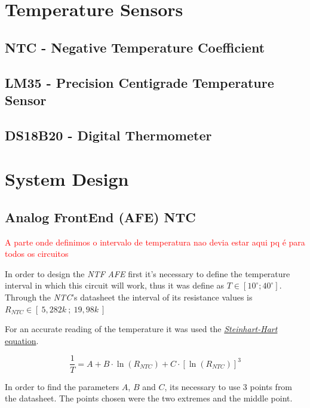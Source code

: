 \documentclass[12pt]{article}
\begin{document}
\section{Temperature Sensors}
\subsection{NTC - Negative Temperature Coefficient}

\subsection{LM35 - Precision Centigrade Temperature Sensor}

\subsection{DS18B20 - Digital Thermometer}

\section{System Design}
\subsection{Analog FrontEnd (AFE) NTC}
\label{ AFENTC }

    \textcolor{red}{A parte onde definimos o intervalo de temperatura nao devia estar aqui pq é para todos os circuitos}


    In order to design the \textit{NTF} \textit{AFE} first it's necessary to define the temperature interval
    in which this circuit will work, thus it was define as $T \in [ 10^{\circ}; 40^{\circ} ]$. 
    Through the \textit{NTC}'s datasheet the interval of its resistance values is $R_{NTC} \in [~5,282k~;~19,98k~]$

    For an accurate reading of the temperature it was used the 
    \hyperref[eq:1]{ \textit{Steinhart-Hart} equation}.

    \begin{equation} \label{eq:1}
    \frac{1}{T} = A + B\cdot \ln(R_{NTC}) + C\cdot [\ln(R_{NTC})]^3
    \end{equation}

    In order to find the parameters $A$, $B$ and $C$, its necessary to use 3 points from the datasheet. 
    The points chosen were the two extremes and the middle point.
\end{document}
